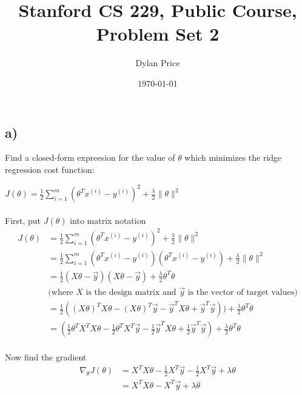 \documentclass[11pt]{article}
\begin{document}
\title{Stanford CS 229, Public Course, Problem Set 2}
\date{\today}
\author{Dylan Price}
\maketitle 

\newcommand{\half}[0]{\frac{1}{2}}
\newcommand{\thetaT}[0]{\theta^{T}}
\newcommand{\ith}[1]{#1^{(i)}}
\newcommand{\xith}[0]{\ith{x}}
\newcommand{\yith}[0]{\ith{y}}
\newcommand{\sumitom}[0]{\sum_{i=1}^{m}}
\newcommand{\xnew}[0]{x_{new}}

\section{}

\subsection*{a)}

Find a closed-form expreesion for the value of $\theta$ which minimizes the ridge regression cost function:

$J(\theta) = \half \sumitom (\thetaT \xith - \yith)^{2} + \frac{\lambda}{2}\|\theta\|^{2}$ \\ \\

First, put $J(\theta)$ into matrix notation
\begin{align*}
  J(\theta) &= \half \sumitom (\thetaT \xith - \yith)^{2} + \frac{\lambda}{2}\|\theta\|^{2} \\
            &= \half \sumitom (\thetaT \xith - \yith)(\thetaT \xith - \yith) + \frac{\lambda}{2}\|\theta\|^{2} \\
            &= \half (X \theta - \vec{y})(X \theta - \vec{y}) + \frac{\lambda}{2} \thetaT \theta \\
            & \text{(where $X$ is the design matrix and $\vec{y}$ is the vector of target values)} \\
            &= \half ((X \theta)^{T} X \theta - (X \theta)^{T} \vec{y} - \vec{y}^{T} X \theta + \vec{y}^{T} \vec{y})) + \frac{\lambda}{2} \thetaT \theta \\
            &= (\half \thetaT X^{T} X \theta - \half \thetaT X^{T} \vec{y} - \half \vec{y}^{T} X \theta + \half \vec{y}^{T} \vec{y}) + \frac{\lambda}{2} \thetaT \theta \\
\end{align*}


Now find the gradient
\begin{align*}
  \nabla_{\theta} J(\theta) &= X^{T} X \theta - \half X^{T} \vec{y} - \half X^{T} \vec{y} + \lambda \theta \\
  &= X^{T} X \theta - X^{T} \vec{y} + \lambda \theta \\
\end{align*}
\end{document}
